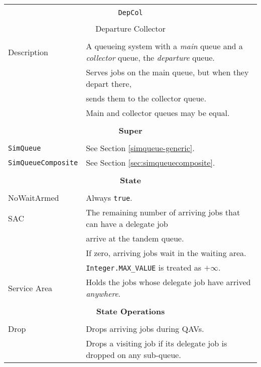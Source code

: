 \begin{tabular}{|l|l|}
	\hline
	\multicolumn{2}{|c|}{} \\
	\multicolumn{2}{|c|}{\lstinline[basicstyle=\large]{DepCol}} \\
	\multicolumn{2}{|c|}{} \\
	\multicolumn{2}{|c|}{Departure Collector} \\
	\multicolumn{2}{|c|}{} \\
	\hline
	Description & A queueing system with a {\em main\/} queue
	and a {\em collector\/} queue, the {\em departure\/} queue.  \\
	&
	Serves jobs on the main queue, but when they depart there, \\
	& sends them to the collector queue.\\
	& Main and collector queues may be equal. \\
	\hline
	\multicolumn{2}{|c|}{} \\
	\multicolumn{2}{|c|}{\bf Super} \\
	\multicolumn{2}{|c|}{} \\
	\hline
	\lstinline|SimQueue| & See Section \ref{simqueue-generic}. \\
	\lstinline|SimQueueComposite| & See Section \ref{sec:simqueuecomposite}. \\
	\hline
	\multicolumn{2}{|c|}{} \\
	\multicolumn{2}{|c|}{\bf State} \\
	\multicolumn{2}{|c|}{} \\
	\hline
	NoWaitArmed & Always \lstinline|true|. \\
	\hline
	SAC & The remaining number of arriving jobs that can have a delegate job \\
	& arrive at the tandem queue. \\
	& If zero, arriving jobs wait in the waiting area. \\
	& \lstinline|Integer.MAX_VALUE| is treated as $+\infty$. \\
	\hline
	Service Area & Holds the jobs whose delegate job have arrived {\em anywhere}. \\
	\hline
	\multicolumn{2}{|c|}{} \\
	\multicolumn{2}{|c|}{\bf State Operations} \\
	\multicolumn{2}{|c|}{} \\
	\hline
	Drop & Drops arriving jobs during QAVs. \\
	& Drops a visiting job if its delegate job is dropped on any sub-queue. \\

\end{tabular}
